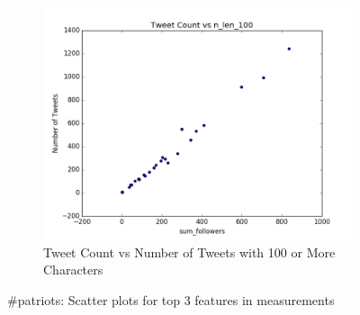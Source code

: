 \documentclass[12pt]{article}
\begin{document}
\begin{figure}[H]
\begin{subfigure}{.45\textwidth}
\includegraphics[width=\textwidth]{figures/count_vs_n_len_100_tweets_patriots.png}
\caption{Tweet Count vs Number of Tweets with 100 or More Characters }
\label{part1:fig:LC}
\end{subfigure}

\caption{\#patriots: Scatter plots for top 3 features in measurements}
\label{part1:fig}
\end{figure}
\end{document}
